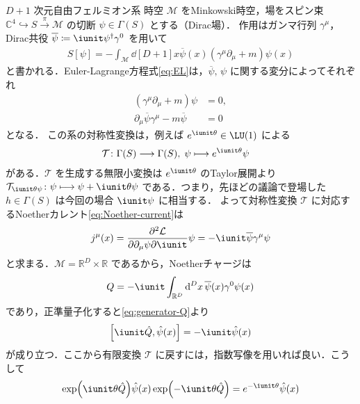 \documentclass[TQFT_main]{subfiles}
\begin{document}
\begin{myexample}[label=ex:3-1]{$D+1$ 次元自由フェルミオン系}
    時空 $\mathcal{M}$ をMinkowski時空，場をスピン束 $\mathbb{C}^4 \hookrightarrow S \xrightarrow{\pi} \mathcal{M}$ の切断 $\psi \in \Gamma(S)$ とする（Dirac場）．
    作用はガンマ行列 $\gamma^\mu$，Dirac共役 $\overline{\psi} \coloneqq \iunit \psi^\dagger \gamma^0$ を用いて
    \begin{align}
        S[\psi] = -\int_{\mathcal{M}} \dd[D+1]{x} \overline{\psi}(x) (\gamma^\mu \partial_\mu + m) \psi(x)
    \end{align}
    と書かれる．Euler-Lagrange方程式\eqref{eq:EL}は，$\overline{\psi},\, \psi$ に関する変分によってそれぞれ
    \begin{align}
        (\gamma^\mu \partial_\mu + m) \psi &= 0, \\
        \partial_\mu\overline{\psi}\gamma^\mu - m \overline{\psi} &= 0
    \end{align}
    となる．
    この系の対称性変換は，例えば $e^{\iunit \theta} \in \LU(1)$ による
    \begin{align}
        \mathcal{T} \colon \Gamma(S) &\lto \Gamma(S),\; \psi \lmto e^{\iunit \theta} \psi
    \end{align}
    がある．$\mathcal{T}$ を生成する無限小変換は $e^{\iunit \theta}$ のTaylor展開より $\mathcal{T}_{\iunit \theta \psi} \colon \psi \lmto \psi + \iunit \theta \psi$ である．つまり，先ほどの議論で登場した $h \in \Gamma(S)$ は今回の場合 $\iunit \psi$ に相当する．
    よって対称性変換 $\mathcal{T}$ に対応するNoetherカレント\eqref{eq:Noether-current}は
    \begin{align}
        \label{eq:Noether-current-ex3-1}
        j^\mu(x) = \pdv{\mathcal{L}}{\partial_\mu \psi} \iunit \psi = -\iunit \overline{\psi} \gamma^\mu \psi
    \end{align}
    と求まる．$\mathcal{M} = \mathbb{R}^D \times \mathbb{R}$ であるから，Noetherチャージは
    \begin{align}
        Q = -\iunit \int_{\mathbb{R}^D} \dd[D]{x} \overline{\psi}(x) \gamma^0 \psi(x)
    \end{align}
    であり，正準量子化すると\eqref{eq:generator-Q}より
    \begin{align}
        \comm{\iunit \hat{Q}}{\hat{\psi}(x)} = -\iunit\hat{\psi}(x)
    \end{align}
    が成り立つ．ここから有限変換 $\mathcal{T}$ に戻すには，指数写像を用いれば良い．こうして
    \begin{align}
        \label{eq:transform-3-1}
        \exp (\iunit \theta \hat{Q}) \hat{\psi}(x) \exp (-\iunit \theta \hat{Q}) = e^{-\iunit \theta} \hat{\psi}(x)

\end{align}
\end{myexample}
\end{document}
